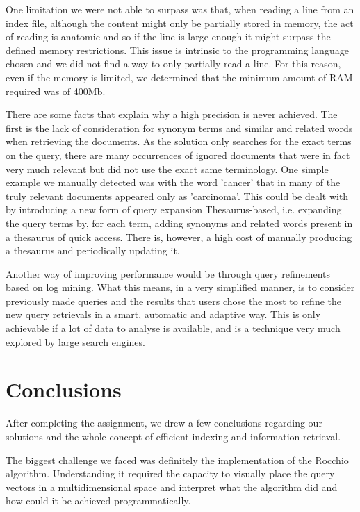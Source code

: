 \documentclass[12pt]{article}
\begin{document}
One limitation we were not able to surpass was that, when reading a line from an 
index file, although the content might only be partially stored in memory, the act
of reading is anatomic and so if the line is large enough it might surpass the 
defined memory restrictions.
This issue is intrinsic to the programming language chosen and we did not find a 
way to only partially read a line.
For this reason, even if the memory is limited, we determined that the minimum 
amount of RAM required was of 400Mb.

There are some facts that explain why a high precision is never achieved.
The first is the lack of consideration for synonym terms and similar and related 
words when retrieving the documents.
As the solution only searches for the exact terms on the query, there are many
occurrences of ignored documents that were in fact very much relevant but did not
use the exact same terminology.
One simple example we manually detected was with the word 'cancer' that in many 
of the truly relevant documents appeared only as 'carcinoma'.
This could be dealt with by introducing a new form of query expansion Thesaurus-based,
i.e. expanding the query terms by, for each term, adding synonyms and related words
present in a thesaurus of quick access.
There is, however, a high cost of manually producing a thesaurus and periodically 
updating it.

Another way of improving performance would be through query refinements based on
log mining.
What this means, in a very simplified manner, is to consider previously made
queries and the results that users chose the most to refine the new query retrievals
in a smart, automatic and adaptive way.
This is only achievable if a lot of data to analyse is available, and is a technique
very much explored by large search engines.

\section{Conclusions}

After completing the assignment, we drew a few conclusions regarding our
solutions and the whole concept of efficient indexing and information retrieval.

The biggest challenge we faced was definitely the implementation of the Rocchio 
algorithm.
Understanding it required the capacity to visually place the query vectors in a 
multidimensional space and interpret what the algorithm did and how could it be 
achieved programmatically.
\end{document}
